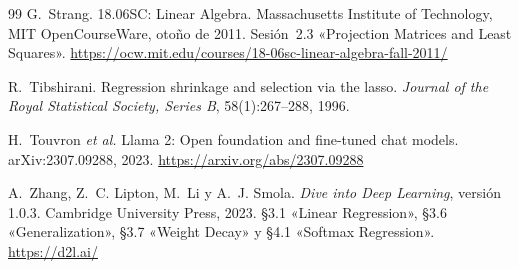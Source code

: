 \begin{thebibliography}{99}
G.~Strang.
\newblock 18.06SC: Linear Algebra.
\newblock Massachusetts Institute of Technology, MIT OpenCourseWare, otoño de 2011. Sesión~2.3 «Projection Matrices and Least Squares».
\newblock \url{https://ocw.mit.edu/courses/18-06sc-linear-algebra-fall-2011/}

R.~Tibshirani.
\newblock Regression shrinkage and selection via the lasso.
\newblock \emph{Journal of the Royal Statistical Society, Series B}, 58(1):267--288, 1996.

H.~Touvron \emph{et al.}
\newblock Llama 2: Open foundation and fine-tuned chat models.
\newblock arXiv:2307.09288, 2023.
\newblock \url{https://arxiv.org/abs/2307.09288}

A.~Zhang, Z.~C. Lipton, M.~Li y A.~J. Smola.
\newblock \emph{Dive into Deep Learning}, versión 1.0.3.
\newblock Cambridge University Press, 2023.
\newblock §3.1 «Linear Regression», §3.6 «Generalization», §3.7 «Weight Decay» y §4.1 «Softmax Regression».
\newblock \url{https://d2l.ai/}

\end{thebibliography}
